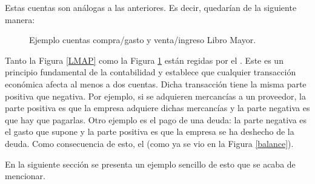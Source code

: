 Estas cuentas son análogas a las anteriores. Es decir, quedarían de la siguiente manera:
\begin{figure}[H]
    \centering
    \hspace{2cm} %
    \caption{Ejemplo cuentas compra/gasto y venta/ingreso Libro Mayor.}
    \label{LMCV}
\end{figure}

Tanto la Figura \ref{LMAP} como la Figura \ref{LMCV} están regidas por el . Este es un principio fundamental de la contabilidad y establece que cualquier transacción económica afecta al menos a dos cuentas. Dicha transacción tiene la misma parte positiva que negativa. Por ejemplo, si se adquieren mercancías a un proveedor, la parte positiva es que la empresa adquiere dichas mercancías y la parte negativa es que hay que pagarlas. Otro ejemplo es el pago de una deuda: la parte negativa es el gasto que supone y la parte positiva es que la empresa se ha deshecho de la deuda. Como consecuencia de esto, el  (como ya se vio en la Figura \ref{balance}). 

En la siguiente sección se presenta un ejemplo sencillo de esto que se acaba de mencionar.

